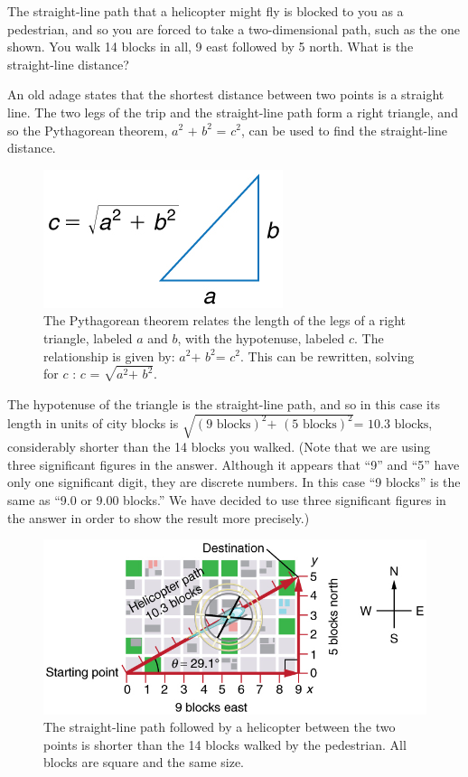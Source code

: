 \documentclass[
]{book}
\begin{document}
The straight-line path that a helicopter might fly is blocked to you as
a pedestrian, and so you are forced to take a two-dimensional path, such
as the one shown. You walk 14 blocks in all, 9 east followed by 5 north.
What is the straight-line distance?

An old adage states that the shortest distance between two points is a
straight line. The two legs of the trip and the straight-line path form
a right triangle, and so the Pythagorean theorem,
\({a^{2}\text{~+~}b^{2}\text{~=~}c^{2}}{}\), can be used to find the
straight-line distance.

\begin{figure}
\hypertarget{import-auto-id1165298608693}{%
\centering
\includegraphics{images/Figure_03_01_02.jpg}
\caption{The Pythagorean theorem relates the length of the legs of a right
triangle, labeled \(a{}\) and \(b{}\), with the hypotenuse, labeled \(c{}\).
The relationship is given by: \({a^{2}\text{+~}b^{2}\text{=~}c^{2}}{}\).
This can be rewritten, solving for \(c{}\) :
\({c\text{~=~}\sqrt{a^{2}\text{+~}b^{2}}}{}\).}\label{import-auto-id1165298608693}
}
\end{figure}

The hypotenuse of the triangle is the straight-line path, and so in this
case its length in units of city blocks is
\({\sqrt{(\text{9\ blocks})^{2}\text{+~}(\text{5\ blocks})^{2}}\text{=~10}\text{.}\text{3\ blocks}}{}\),
considerably shorter than the 14 blocks you walked. (Note that we are
using three significant figures in the answer. Although it appears that
``9'' and ``5'' have only one significant digit, they are discrete numbers.
In this case ``9 blocks'' is the same as ``9.0 or 9.00 blocks.'' We have
decided to use three significant figures in the answer in order to show
the result more precisely.)

\begin{figure}
\hypertarget{import-auto-id1165298535408}{%
\centering
\includegraphics{images/Figure_03_01_03.jpg}
\caption{The straight-line path followed by a helicopter between the two points
is shorter than the 14 blocks walked by the pedestrian. All blocks are
square and the same
size.}\label{import-auto-id1165298535408}
}
\end{figure}
\end{document}
